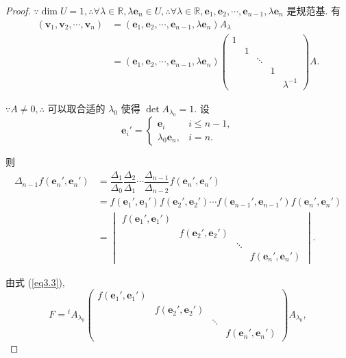 \documentclass{ctexart}
\begin{document}
\begin{proof}
    $\because\dim U=1,\therefore\forall\lambda\in\mathbb{R},\lambda\boldsymbol{e}_n\in U,\therefore\forall\lambda\in\mathbb{R},\boldsymbol{e}_1,\boldsymbol{e}_2,\cdots,\boldsymbol{e}_{n-1},\lambda\boldsymbol{e}_n$ 是规范基. 有
    \begin{align*}
        (\boldsymbol{v}_1,\boldsymbol{v}_2,\cdots,\boldsymbol{v}_n) & =(\boldsymbol{e}_1,\boldsymbol{e}_2,\cdots,\boldsymbol{e}_{n-1},\lambda\boldsymbol{e}_n)A_\lambda \\
        & =(\boldsymbol{e}_1,\boldsymbol{e}_2,\cdots,\boldsymbol{e}_{n-1},\lambda\boldsymbol{e}_n)\begin{pmatrix}
            1 \\
            & 1 \\
            && \ddots \\
            &&& 1 \\
            &&&& \lambda^{-1}
        \end{pmatrix}A.
    \end{align*}

    $\because A\neq0,\therefore$ 可以取合适的 $\lambda_0$ 使得 $\det A_{\lambda_0}=1$. 设
    \[\boldsymbol{e}_i'=\begin{cases}
        \boldsymbol{e}_i & i\leq n-1, \\
        \lambda_0\boldsymbol{e}_n, & i=n.
    \end{cases}\]

    则
    \begin{align*}
        \Delta_{n-1}f(\boldsymbol{e}_n',\boldsymbol{e}_n') & =\dfrac{\Delta_1}{\Delta_0}\dfrac{\Delta_2}{\Delta_1}\cdots\dfrac{\Delta_{n-1}}{\Delta_{n-2}}f(\boldsymbol{e}_n',\boldsymbol{e}_n') \\
        & =f(\boldsymbol{e}_1',\boldsymbol{e}_1')f(\boldsymbol{e}_2',\boldsymbol{e}_2')\cdots f(\boldsymbol{e}_{n-1}',\boldsymbol{e}_{n-1}')f(\boldsymbol{e}_n',\boldsymbol{e}_n') \\
        & =\begin{vmatrix}
            f(\boldsymbol{e}_1',\boldsymbol{e}_1') \\
            & f(\boldsymbol{e}_2',\boldsymbol{e}_2') \\
            && \ddots \\
            &&& f(\boldsymbol{e}_n',\boldsymbol{e}_n')
        \end{vmatrix}.
    \end{align*}

    由式 (\ref{eq3.3}),
    \[F={}^tA_{\lambda_0}\begin{pmatrix}
        f(\boldsymbol{e}_1',\boldsymbol{e}_1') \\
        & f(\boldsymbol{e}_2',\boldsymbol{e}_2') \\
        && \ddots \\
        &&& f(\boldsymbol{e}_n',\boldsymbol{e}_n')
    \end{pmatrix}A_{\lambda_0},\]


\end{proof}
\end{document}
